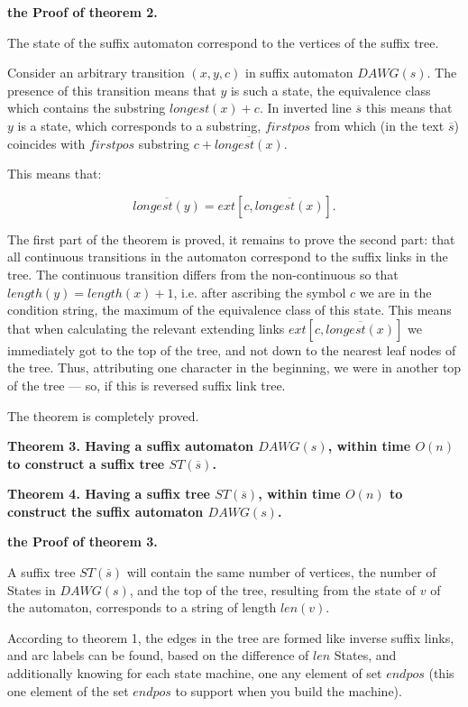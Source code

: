 \bf{the Proof of theorem 2}.

The state of the suffix automaton correspond to the vertices of the suffix tree.

Consider an arbitrary transition $(x,y,c)$ in suffix automaton $DAWG(s)$. The presence of this transition means that $y$ is such a state, the equivalence class which contains the substring $longest(x) + c$. In inverted line $\overline{s}$ this means that $y$ is a state, which corresponds to a substring, $firstpos$ from which (in the text $\overline{s}$) coincides with $firstpos$ substring $c + \overline{longest(x)}$.

This means that:

$$ \overline{longest(y)} = ext[c, \overline{longest(x)}]. $$

The first part of the theorem is proved, it remains to prove the second part: that all continuous transitions in the automaton correspond to the suffix links in the tree. The continuous transition differs from the non-continuous so that $length(y) = length(x) + 1$, i.e. after ascribing the symbol $c$ we are in the condition string, the maximum of the equivalence class of this state. This means that when calculating the relevant extending links $ext[c, \overline{longest(x)}]$ we immediately got to the top of the tree, and not down to the nearest leaf nodes of the tree. Thus, attributing one character in the beginning, we were in another top of the tree --- so, if this is reversed suffix link tree.

The theorem is completely proved.

\bf{Theorem 3}. Having a suffix automaton $DAWG(s)$, within time $O(n)$ to construct a suffix tree $ST(\overline{s})$.

\bf{Theorem 4}. Having a suffix tree $ST(\overline{s})$, within time $O(n)$ to construct the suffix automaton $DAWG(s)$.

\bf{the Proof of theorem 3}.

A suffix tree $ST(\overline{s})$ will contain the same number of vertices, the number of States in $DAWG(s)$, and the top of the tree, resulting from the state of $v$ of the automaton, corresponds to a string of length $len(v)$.

According to theorem 1, the edges in the tree are formed like inverse suffix links, and arc labels can be found, based on the difference of $len$ States, and additionally knowing for each state machine, one any element of set $endpos$ (this one element of the set $endpos$ to support when you build the machine).


